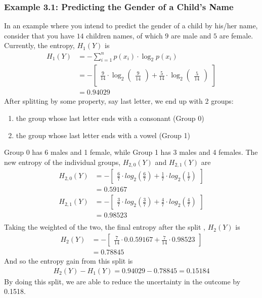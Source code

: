 \documentclass[11pt]{article}
\begin{document}
\subsubsection*{Example 3.1: Predicting the Gender of a Child's Name}
In an example where you intend to predict the gender of a child by his/her name, consider that you have $14$ children names, of which $9$ are male and $5$ are female. Currently, the entropy, $H_1(Y)$ is
\begin{align*}
H_1(Y) &= -\sum_{i=1}^n p(x_i)\cdot \log_2p(x_i)\\
&= -\begin{bmatrix}\frac 9 {14} \cdot \log_2 \begin{pmatrix}\frac 9 {14}\end{pmatrix} + \frac 5 {14} \cdot \log_2 \begin{pmatrix}\frac 5 {14}\end{pmatrix}\end{bmatrix}
\\&=0.94029
\end{align*}
After splitting by some property, say last letter, we end up with 2 groups: 
\begin{enumerate}
	\item{the group whose last letter ends with a consonant (Group 0)}
	\item{the group whose last letter ends with a vowel (Group 1)}
\end{enumerate}
 Group 0 has 6 males and 1 female, while Group 1 has 3 males and 4 females. The new entropy of the individual groups, $H_{2,0}(Y)$ and $H_{2,1}(Y)$ are
\begin{align*}
H_{2,0}(Y) &=-\begin{bmatrix}
\frac 67\cdot log_2(\frac 67) + \frac 17\cdot log_2(\frac 17) \end{bmatrix}\\&=0.59167\\
H_{2,1}(Y) &=-\begin{bmatrix}\frac 37\cdot log_2(\frac 37) + \frac 47\cdot log_2(\frac 47)\end{bmatrix} \\&=0.98523\\
\end{align*}
Taking the weighted of the two, the final entropy after the split , $H_2(Y)$ is
\begin{align*}
H_2(Y) &= -\begin{bmatrix}\frac 7 {14} \cdot 0.0.59167 + \frac 7{14} \cdot 0.98523\end{bmatrix}\\&= 0.78845
\end{align*}
And so the entropy gain from this split is 
\begin{align*}
H_2(Y) - H_1(Y) = 0.94029-0.78845 = 0.15184
\end{align*}
By doing this split, we are able to reduce the uncertainty in the outcome by 0.1518.
\end{document}
